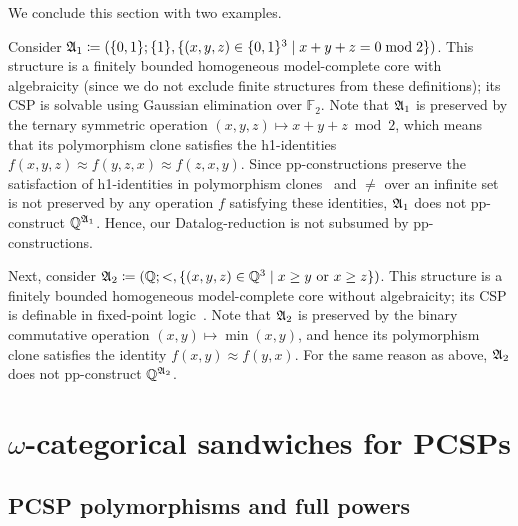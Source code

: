 We conclude this section with two examples. 

\begin{example} \label{ex:two_ex}  Consider $\mathfrak{A}_1\mathrel{\mathop:}\mathrel{\mkern-1.2mu}= (\{0,1\};\{1\}, \{(x,y,z)\in \{0,1\}^3 \mid x+y+z=0 \bmod 2\})$.
%
This structure is a finitely bounded homogeneous model-complete core with algebraicity (since we do not exclude finite structures from these definitions); its CSP is solvable using Gaussian elimination over $\mathbb{F}_2$. 
% 
Note that $\mathfrak{A}_1$ is preserved by the ternary symmetric operation $(x,y,z)\mapsto x+y+z \bmod 2$, which means that its polymorphism clone satisfies the h1-identities $ f(x,y,z) \approx f(y,z,x) \approx f(z,x,y)$.
%
Since pp-constructions preserve the satisfaction of h1-identities in polymorphism clones~\cite{barto2018wonderland} and $\neq$ over an infinite set is not preserved by any operation $f$ satisfying these identities,  $\mathfrak{A}_1$ does not pp-construct $\mathbb{Q}^{\mathfrak{A}_1}$. 
%
 Hence, our Datalog-reduction is not subsumed by pp-constructions. 
 
%
Next, consider $\mathfrak{A}_2\mathrel{\mathop:}\mathrel{\mkern-1.2mu}= (\mathbb{Q};<,\{(x,y,z) \in \mathbb{Q}^{3} \mid x\geq y \text{ or } x\geq z\})$.
%
This structure is a finitely bounded homogeneous model-complete core without algebraicity;
its CSP is definable in fixed-point logic~\cite[Proposition~3.7]{bodirsky2022descriptive}.
%
Note that $\mathfrak{A}_2$ is preserved by the binary commutative operation $(x,y)\mapsto \min(x,y)$, and hence its polymorphism clone satisfies the identity $  f(x,y) \approx f(y,x)$.
% 
For the same reason as above, $\mathfrak{A}_2$ does not pp-construct $\mathbb{Q}^{\mathfrak{A}_2}$.  
\end{example}

 


\section{\texorpdfstring{$\omega$}{omega}-categorical sandwiches for PCSPs} \label{section:sandwiches}

\subsection{PCSP polymorphisms and full powers}

